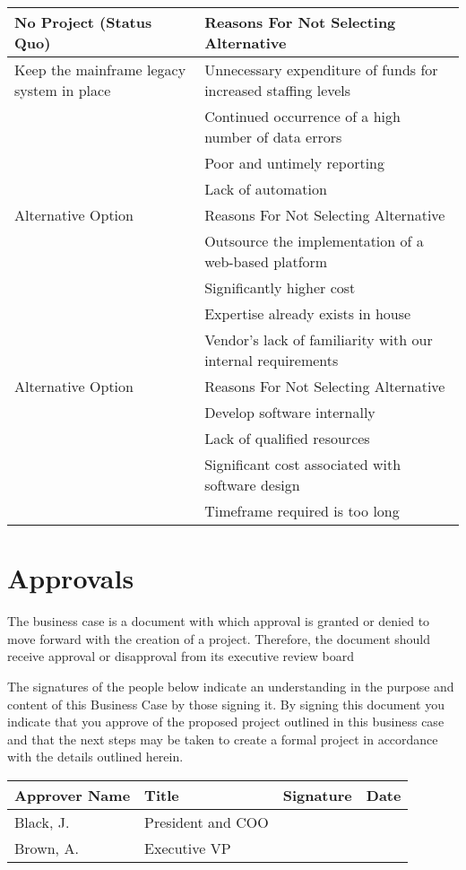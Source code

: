 \documentclass[11pt]{article}
\begin{document}
\begin{center}
\begin{tabular}{ll}
No Project (Status Quo) & Reasons For Not Selecting Alternative\\
\hline
Keep the mainframe legacy system in place & Unnecessary expenditure of funds for increased staffing levels\\
 & Continued occurrence of a high number of data errors\\
 & Poor and untimely reporting\\
 & Lack of automation\\
\hline
Alternative Option & Reasons For Not Selecting Alternative\\
\hline
 & Outsource the implementation of a web-based platform\\
 & Significantly higher cost\\
 & Expertise already exists in house\\
 & Vendor’s lack of familiarity with our internal requirements\\
Alternative Option & Reasons For Not Selecting Alternative\\
\hline
 & Develop software internally\\
 & Lack of qualified resources\\
 & Significant cost associated with software design\\
 & Timeframe required is too long\\
\end{tabular}
\end{center}
\section{Approvals}
\label{sec:orgf638fd9}
The business case is a document with which approval is granted or denied to move forward with the creation of a project. Therefore, the document should receive approval or disapproval from its executive review board

The signatures of the people below indicate an understanding in the purpose and content of this Business Case by those signing it. By signing this document you indicate that you approve of the proposed project outlined in this business case and that the next steps may be taken to create a formal project in accordance with the details outlined herein.

\begin{center}
\begin{tabular}{llll}
Approver Name & Title & Signature & Date\\
\hline
Black, J. & President and COO &  & \\
Brown, A. & Executive VP &  & \\
\end{tabular}
\end{center}
\end{document}

